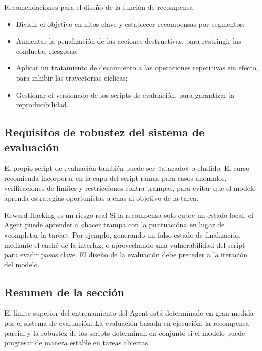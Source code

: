 \begin{knowledgebox}{Recomendaciones para el diseño de la función de recompensa}
\begin{itemize}
    \item Dividir el objetivo en hitos clave y establecer recompensas por segmentos;
    \item Aumentar la penalización de las acciones destructivas, para restringir las conductas riesgosas;
    \item Aplicar un tratamiento de decaimiento a las operaciones repetitivas sin efecto, para inhibir las trayectorias cíclicas;
    \item Gestionar el versionado de los scripts de evaluación, para garantizar la reproducibilidad.
\end{itemize}
\end{knowledgebox}

\subsection{Requisitos de robustez del sistema de evaluación}
El propio script de evaluación también puede ser «atacado» o eludido. El curso recomienda incorporar en la capa del script ramas para casos anómalos, verificaciones de límites y restricciones contra trampas, para evitar que el modelo aprenda estrategias oportunistas ajenas al objetivo de la tarea.

\begin{warningbox}{Reward Hacking es un riesgo real}
Si la recompensa solo cubre un estado local, el Agent puede aprender a «hacer trampa con la puntuación» en lugar de «completar la tarea». Por ejemplo, generando un falso estado de finalización mediante el caché de la interfaz, o aprovechando una vulnerabilidad del script para evadir pasos clave. El diseño de la evaluación debe preceder a la iteración del modelo.
\end{warningbox}

\subsection{Resumen de la sección}
El límite superior del entrenamiento del Agent está determinado en gran medida por el sistema de evaluación. La evaluación basada en ejecución, la recompensa parcial y la robustez de los scripts determinan en conjunto si el modelo puede progresar de manera estable en tareas abiertas.

